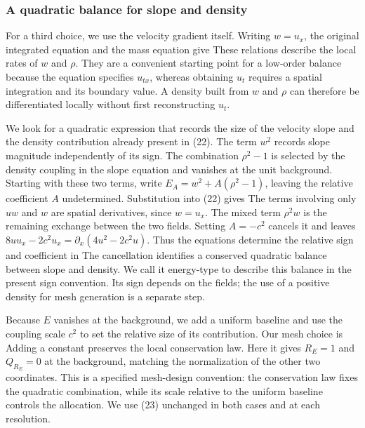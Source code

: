 \subsubsection*{A quadratic balance for slope and density}

For a third choice, we use the velocity gradient itself. Writing \(w=u_x\), the original integrated equation and the mass equation give
These relations describe the local rates of \(w\) and \(\rho\). They are a convenient starting point for a low-order balance because the equation specifies \(u_{tx}\), whereas obtaining \(u_t\) requires a spatial integration and its boundary value. A density built from \(w\) and \(\rho\) can therefore be differentiated locally without first reconstructing \(u_t\).

We look for a quadratic expression that records the size of the velocity slope and the density contribution already present in (22). The term \(w^2\) records slope magnitude independently of its sign. The combination \(\rho^2-1\) is selected by the density coupling in the slope equation and vanishes at the unit background. Starting with these two terms, write \(E_A=w^2+A(\rho^2-1)\), leaving the relative coefficient \(A\) undetermined. Substitution into (22) gives
The terms involving only \(uw\) and \(w\) are spatial derivatives, since \(w=u_x\). The mixed term \(\rho^2w\) is the remaining exchange between the two fields. Setting \(A=-c^2\) cancels it and leaves \(8uu_x-2c^2u_x=\partial_x(4u^2-2c^2u)\). Thus the equations determine the relative sign and coefficient in
The cancellation identifies a conserved quadratic balance between slope and density. We call it energy-type to describe this balance in the present sign convention. Its sign depends on the fields; the use of a positive density for mesh generation is a separate step.

Because \(E\) vanishes at the background, we add a uniform baseline and use the coupling scale \(c^2\) to set the relative size of its contribution. Our mesh choice is
Adding a constant preserves the local conservation law. Here it gives \(R_E=1\) and \(Q_{R_E}=0\) at the background, matching the normalization of the other two coordinates. This is a specified mesh-design convention: the conservation law fixes the quadratic combination, while its scale relative to the uniform baseline controls the allocation. We use (23) unchanged in both cases and at each resolution.

